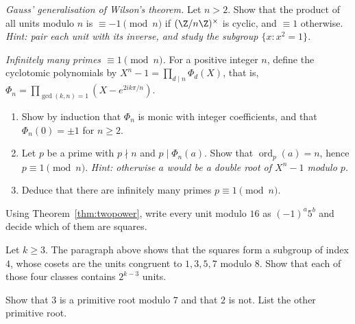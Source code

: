 \begin{exercise}[$\star\star\star$]\label{ex:gausswilson}
\emph{Gauss' generalisation of Wilson's theorem.} Let $n>2$. Show that the product of all units modulo $n$ is $\equiv-1\pmod n$ if $(\Z/n\Z)^\times$ is cyclic, and $\equiv1$ otherwise. \emph{Hint: pair each unit with its inverse, and study the subgroup $\{x:x^2=1\}$.}
\end{exercise}

\begin{exercise}[$\star\star\star$]\label{ex:cyclotomic}
\emph{Infinitely many primes $\equiv1\pmod n$.} For a positive integer $n$, define the cyclotomic polynomials by $X^n-1=\prod_{d\mid n}\Phi_d(X)$, that is, $\Phi_n=\prod_{\gcd(k,n)=1}\left(X-e^{2ik\pi/n}\right)$.
\begin{enumerate}[label=(\alph*)]
\item Show by induction that $\Phi_n$ is monic with integer coefficients, and that $\Phi_n(0)=\pm1$ for $n\ge2$.
\item Let $p$ be a prime with $p\nmid n$ and $p\mid\Phi_n(a)$. Show that $\operatorname{ord}_p(a)=n$, hence $p\equiv1\pmod n$. \emph{Hint: otherwise $a$ would be a double root of $X^n-1$ modulo $p$.}
\item Deduce that there are infinitely many primes $p\equiv1\pmod n$.
\end{enumerate}
\end{exercise}

\begin{exercise}[$\star$]\label{ex:t1-units16}
Using Theorem~\ref{thm:twopower}, write every unit modulo $16$ as $(-1)^a5^b$ and decide which of them are squares.
\end{exercise}

\begin{exercise}[$\star\star$]\label{ex:t1-square-cosets}
Let $k\ge3$. The paragraph above shows that the squares form a subgroup of index $4$, whose cosets are the units congruent to $1,3,5,7$ modulo $8$. Show that each of those four classes contains $2^{k-3}$ units.
\end{exercise}

\begin{exercise}[$\star$]\label{ex:t1-gen7}
Show that $3$ is a primitive root modulo $7$ and that $2$ is not. List the other primitive root.
\end{exercise}

